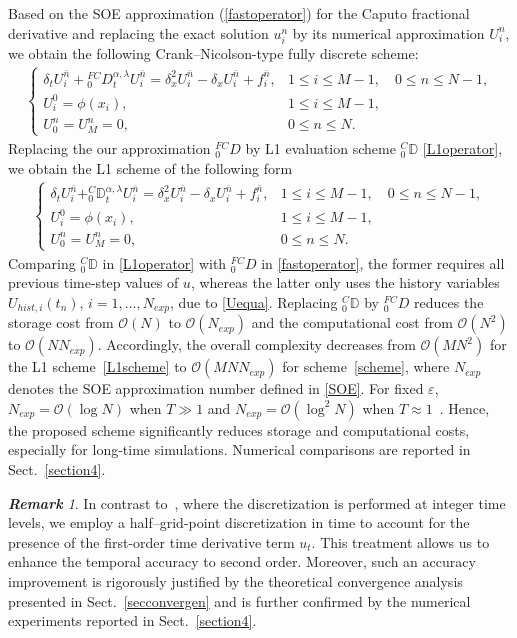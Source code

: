 \documentclass[10pt, reqno]{amsart}
\theoremstyle{remark}
\newtheorem{rem}{\bf Remark}[section]
\theoremstyle{definition}
\numberwithin{table}{section}
\begin{document}
Based on the SOE approximation (\ref{fastoperator}) for the Caputo fractional derivative and replacing the exact solution $u_i^n$ by its numerical approximation $U_i^n$, we obtain the following Crank–Nicolson-type fully discrete scheme:
\begin{align}\label{scheme}
\begin{cases}
\delta_t U_i^{\bar{n}} + {}_0^{FC}D_t^{\alpha, \lambda} U_i^{\bar{n}}
= \delta_x^2 U_i^{\bar{n}} - \delta_x U_i^{\bar{n}} + f_i^{\bar{n}},
& 1 \le i \le M-1,\quad 0 \le n \le N-1, \\
U_i^0 = \phi(x_i),
& 1 \le i \le M-1, \\
U_0^n = U_M^n = 0,
& 0 \le n \le N.
\end{cases}
\end{align}
Replacing the our approximation ${}_0^{FC}D$ by L1 evaluation scheme $_0^C\mathbb{D}$ \eqref{L1operator}, we obtain the L1 scheme of the following form
\begin{align}\label{L1scheme}
\begin{cases}
\delta_t U_i^{\bar{n}} + _0^C\mathbb{D}_t^{\alpha, \lambda} U_i^{\bar{n}}
= \delta_x^2 U_i^{\bar{n}} - \delta_x U_i^{\bar{n}} + f_i^{\bar{n}},
& 1 \le i \le M-1,\quad 0 \le n \le N-1, \\
U_i^0 = \phi(x_i),
& 1 \le i \le M-1, \\
U_0^n = U_M^n = 0,
& 0 \le n \le N.
\end{cases}
\end{align}
Comparing $_0^C\mathbb{D}$ in \eqref{L1operator} with ${}_0^{FC}D$ in \eqref{fastoperator}, 
the former requires all previous time-step values of $u$, whereas the latter only uses the history variables $U_{hist,i}(t_n)$, $i=1,\ldots,N_{exp}$, due to \eqref{Uequa}. 
Replacing $_0^C\mathbb{D}$ by ${}_0^{FC}D$ reduces the storage cost from $\mathcal{O}(N)$ to $\mathcal{O}(N_{exp})$ and the computational cost from $\mathcal{O}(N^2)$ to $\mathcal{O}(NN_{exp})$. 
Accordingly, the overall complexity decreases from $\mathcal{O}(MN^2)$ for the L1 scheme~\eqref{L1scheme} to $\mathcal{O}(MNN_{exp})$ for scheme~\eqref{scheme}, where $N_{exp}$ denotes the SOE approximation number defined in \eqref{SOE}. For fixed $\varepsilon$, $N_{exp}=\mathcal{O}(\log N)$ when $T\gg1$ and $N_{exp}=\mathcal{O}(\log^2 N)$ when $T\approx1$~\cite{jiang2017,zhu2019}. 
Hence, the proposed scheme significantly reduces storage and computational costs, especially for long-time simulations. Numerical comparisons are reported in Sect.~\ref{section4}.


\begin{rem}
    In contrast to~\cite{cao2020}, where the discretization is performed at integer time levels, we employ a half–grid-point discretization in time to account for the presence of the first-order time derivative term $u_t$. This treatment allows us to enhance the temporal accuracy to second order. Moreover, such an accuracy improvement is rigorously justified by the theoretical convergence analysis presented in Sect.~\ref{secconvergen} and is further confirmed by the numerical experiments reported in Sect.~\ref{section4}.
\end{rem}
\end{document}
